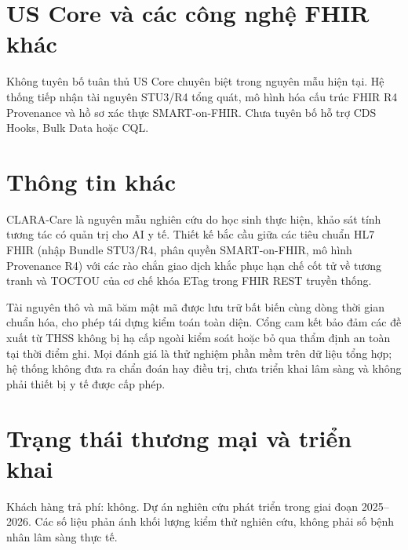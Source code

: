 \documentclass[10pt]{article}
\begin{document}
\section{US Core và các công nghệ FHIR khác}
Không tuyên bố tuân thủ US Core chuyên biệt trong nguyên mẫu hiện tại. Hệ thống tiếp nhận tài nguyên STU3/R4 tổng quát, mô hình hóa cấu trúc FHIR R4 Provenance và hồ sơ xác thực SMART-on-FHIR. Chưa tuyên bố hỗ trợ CDS Hooks, Bulk Data hoặc CQL.

\section{Thông tin khác}
CLARA-Care là nguyên mẫu nghiên cứu do học sinh thực hiện, khảo sát tính tương tác có quản trị cho AI y tế. Thiết kế bắc cầu giữa các tiêu chuẩn HL7 FHIR (nhập Bundle STU3/R4, phân quyền SMART-on-FHIR, mô hình Provenance R4) với các rào chắn giao dịch khắc phục hạn chế cốt tử về tương tranh và TOCTOU của cơ chế khóa ETag trong FHIR REST truyền thống.

Tài nguyên thô và mã băm mật mã được lưu trữ bất biến cùng dòng thời gian chuẩn hóa, cho phép tái dựng kiểm toán toàn diện. Cổng cam kết bảo đảm các đề xuất từ THSS không bị hạ cấp ngoài kiểm soát hoặc bỏ qua thẩm định an toàn tại thời điểm ghi. Mọi đánh giá là thử nghiệm phần mềm trên dữ liệu tổng hợp; hệ thống không đưa ra chẩn đoán hay điều trị, chưa triển khai lâm sàng và không phải thiết bị y tế được cấp phép.

\section{Trạng thái thương mại và triển khai}
Khách hàng trả phí: không. Dự án nghiên cứu phát triển trong giai đoạn 2025--2026. Các số liệu phản ánh khối lượng kiểm thử nghiên cứu, không phải số bệnh nhân lâm sàng thực tế.
\end{document}

